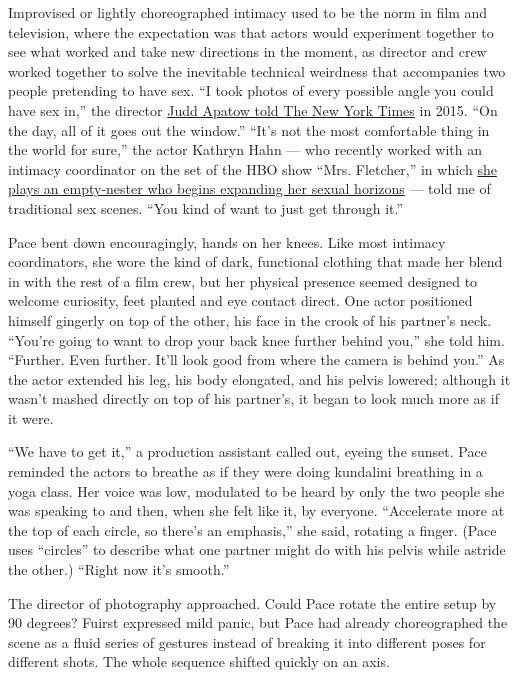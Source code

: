 Improvised or lightly choreographed intimacy used to be the norm in film
and television, where the expectation was that actors would experiment
together to see what worked and take new directions in the moment, as
director and crew worked together to solve the inevitable technical
weirdness that accompanies two people pretending to have sex. ``I took
photos of every possible angle you could have sex in,'' the director
\href{https://www.nytimes3xbfgragh.onion/2015/03/01/movies/shooting-film-and-tv-sex-scenes-what-really-goes-on.html}{Judd
Apatow told The New York Times} in 2015. ``On the day, all of it goes
out the window.'' ``It's not the most comfortable thing in the world for
sure,'' the actor Kathryn Hahn --- who recently worked with an intimacy
coordinator on the set of the HBO show ``Mrs. Fletcher,'' in which
\href{https://www.nytimes3xbfgragh.onion/interactive/2019/10/09/magazine/kathryn-hahn-mrs-fletcher.html}{she
plays an empty-nester who begins expanding her sexual horizons} --- told
me of traditional sex scenes. ``You kind of want to just get through
it.''

Pace bent down encouragingly, hands on her knees. Like most intimacy
coordinators, she wore the kind of dark, functional clothing that made
her blend in with the rest of a film crew, but her physical presence
seemed designed to welcome curiosity, feet planted and eye contact
direct. One actor positioned himself gingerly on top of the other, his
face in the crook of his partner's neck. ``You're going to want to drop
your back knee further behind you,'' she told him. ``Further. Even
further. It'll look good from where the camera is behind you.'' As the
actor extended his leg, his body elongated, and his pelvis lowered;
although it wasn't mashed directly on top of his partner's, it began to
look much more as if it were.

``We have to get it,'' a production assistant called out, eyeing the
sunset. Pace reminded the actors to breathe as if they were doing
kundalini breathing in a yoga class. Her voice was low, modulated to be
heard by only the two people she was speaking to and then, when she felt
like it, by everyone. ``Accelerate more at the top of each circle, so
there's an emphasis,'' she said, rotating a finger. (Pace uses
``circles'' to describe what one partner might do with his pelvis while
astride the other.) ``Right now it's smooth.''

The director of photography approached. Could Pace rotate the entire
setup by 90 degrees? Fuirst expressed mild panic, but Pace had already
choreographed the scene as a fluid series of gestures instead of
breaking it into different poses for different shots. The whole sequence
shifted quickly on an axis.


